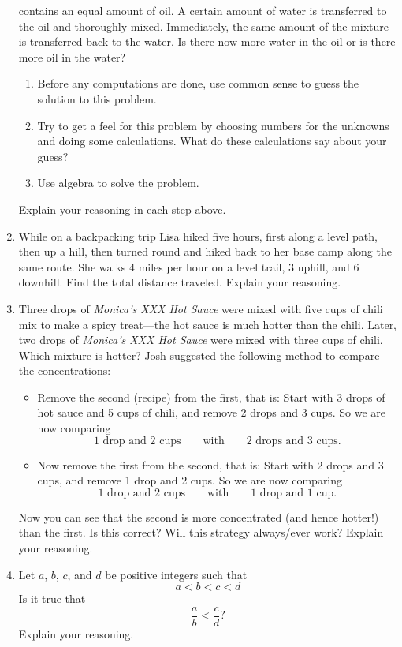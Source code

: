 \begin{problems}
\begin{enumerate}
  contains an equal amount of oil. A certain amount of water is
  transferred to the oil and thoroughly mixed. Immediately, the same
  amount of the mixture is transferred back to the water. Is there now
  more water in the oil or is there more oil in the water?
\begin{enumerate}
\item Before any computations are done, use common sense to guess the
  solution to this problem.
\item Try to get a feel for this problem by choosing numbers for the
  unknowns and doing some calculations. What do these calculations say
  about your guess?
\item Use algebra to solve the problem.
\end{enumerate}
Explain your reasoning in each step above.
\item While on a backpacking trip Lisa hiked five hours, first along a
  level path, then up a hill, then turned round and hiked back to her
  base camp along the same route. She walks $4$ miles per hour on a
  level trail, $3$ uphill, and $6$ downhill. Find the total distance
  traveled. Explain your reasoning.
\item Three drops of \textit{Monica's XXX Hot Sauce} were mixed with
  five cups of chili mix to make a spicy treat---the hot sauce is much
  hotter than the chili. Later, two drops of \textit{Monica's XXX Hot
    Sauce} were mixed with three cups of chili. Which mixture is
  hotter? Josh suggested the following method to compare the
  concentrations:
\begin{itemize}
\item Remove the second (recipe) from the first, that is: Start with 3
  drops of hot sauce and 5 cups of chili, and remove 2 drops and 3
  cups. So we are now comparing
\[
\text{1 drop and 2 cups}\qquad\text{with}\qquad\text{2 drops and 3 cups.}
\]
\item Now remove the first from the second, that is: Start with 2
  drops and 3 cups, and remove 1 drop and 2 cups. So we are now
  comparing
\[
\text{1 drop and 2 cups}\qquad\text{with}\qquad\text{1 drop and 1
  cup.}
\]
\end{itemize}
Now you can see that the second is more concentrated (and hence
hotter!) than the first. Is this correct? Will this strategy
always/ever work? Explain your reasoning.
\item Let $a$, $b$, $c$, and $d$ be positive integers such that 
\[
a<b<c<d
\]
Is it true that 
\[
\frac{a}{b}<\frac{c}{d}?
\]
Explain your reasoning.

\end{enumerate}
\end{problems}
